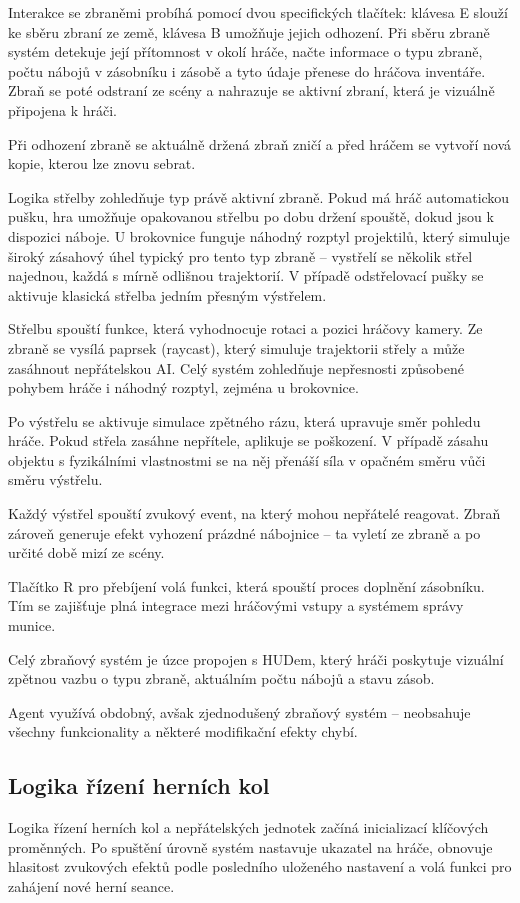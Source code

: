 Interakce se zbraněmi probíhá pomocí dvou specifických tlačítek: klávesa E slouží ke sběru zbraní ze země, klávesa B umožňuje jejich odhození. Při sběru zbraně systém detekuje její přítomnost v okolí hráče, načte informace o typu zbraně, počtu nábojů v zásobníku i zásobě a tyto údaje přenese do hráčova inventáře. Zbraň se poté odstraní ze scény a nahrazuje se aktivní zbraní, která je vizuálně připojena k hráči.

Při odhození zbraně se aktuálně držená zbraň zničí a před hráčem se vytvoří nová kopie, kterou lze znovu sebrat.

Logika střelby zohledňuje typ právě aktivní zbraně. Pokud má hráč automatickou pušku, hra umožňuje opakovanou střelbu po dobu držení spouště, dokud jsou k dispozici náboje. U brokovnice funguje náhodný rozptyl projektilů, který simuluje široký zásahový úhel typický pro tento typ zbraně – vystřelí se několik střel najednou, každá s mírně odlišnou trajektorií. V případě odstřelovací pušky se aktivuje klasická střelba jedním přesným výstřelem.

Střelbu spouští funkce, která vyhodnocuje rotaci a pozici hráčovy kamery. Ze zbraně se vysílá paprsek (raycast), který simuluje trajektorii střely a může zasáhnout nepřátelskou AI. Celý systém zohledňuje nepřesnosti způsobené pohybem hráče i náhodný rozptyl, zejména u brokovnice.

Po výstřelu se aktivuje simulace zpětného rázu, která upravuje směr pohledu hráče. Pokud střela zasáhne nepřítele, aplikuje se poškození. V případě zásahu objektu s fyzikálními vlastnostmi se na něj přenáší síla v opačném směru vůči směru výstřelu.

Každý výstřel spouští zvukový event, na který mohou nepřátelé reagovat. Zbraň zároveň generuje efekt vyhození prázdné nábojnice – ta vyletí ze zbraně a po určité době mizí ze scény.

Tlačítko R pro přebíjení volá funkci, která spouští proces doplnění zásobníku. Tím se zajišťuje plná integrace mezi hráčovými vstupy a systémem správy munice.

Celý zbraňový systém je úzce propojen s HUDem, který hráči poskytuje vizuální zpětnou vazbu o typu zbraně, aktuálním počtu nábojů a stavu zásob.

Agent využívá obdobný, avšak zjednodušený zbraňový systém – neobsahuje všechny funkcionality a některé modifikační efekty chybí.

\subsection{Logika řízení herních kol}
Logika řízení herních kol a nepřátelských jednotek začíná inicializací klíčových proměnných. Po spuštění úrovně systém nastavuje ukazatel na hráče, obnovuje hlasitost zvukových efektů podle posledního uloženého nastavení a volá funkci pro zahájení nové herní seance.

